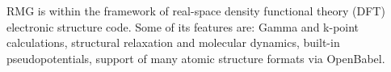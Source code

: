 RMG is within the framework of real-space density functional theory (DFT) electronic structure code. Some of its features are: Gamma and k-point calculations, structural relaxation and molecular dynamics, built-in pseudopotentials, support of many atomic structure formats via OpenBabel.